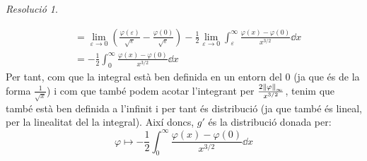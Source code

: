 \documentclass[10pt,a4paper]{article}
\theoremstyle{definition}
\theoremstyle{remark}
\newtheorem*{res}{Resolució}
\begin{document}
\begin{res}
\begin{enumerate}
\begin{align*}
                                                                 & =\lim_{\varepsilon\to 0}\left(\frac{\varphi(\varepsilon)}{\sqrt{\varepsilon}}-\frac{\varphi(0)}{\sqrt{\varepsilon}}\right)-\frac{1}{2}\lim_{\varepsilon\to 0}\int_\varepsilon^\infty\frac{\varphi(x)-\varphi(0)}{x^{3/2}}\dd{x} \\
                                                                 & =-\frac{1}{2}\int_0^\infty\frac{\varphi(x)-\varphi(0)}{x^{3/2}}\dd{x}
          \end{align*}
          Per tant, com que la integral està ben definida en un entorn del 0 (ja que és de la forma $\frac{1}{\sqrt{x}}$) i com que també podem acotar l'integrant per $\frac{2\norm{\varphi}_\infty}{x^{3/2}}$, tenim que també està ben definida a l'infinit i per tant és distribució (ja que també és lineal, per la linealitat del la integral). Així doncs, $g'$ és la distribució donada per:
          $$
            \varphi\longmapsto -\frac{1}{2}\int_0^\infty\frac{\varphi(x)-\varphi(0)}{x^{3/2}}\dd{x}
          $$
  \end{enumerate}
\end{res}
\end{document}

